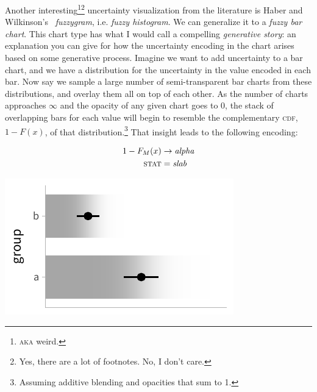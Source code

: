 \documentclass[journal]{vgtc}              %
\begin{document}
Another interesting\footnote{\textsc{aka} weird.}\footnote{Yes, there are a lot of footnotes. No, I don't care.} uncertainty visualization from the literature is Haber and Wilkinson's~\cite{haber1982perceptual} \textit{fuzzygram}, i.e. \textit{fuzzy histogram}. We can generalize it to a \textit{fuzzy bar chart}. This chart type has what I would call a compelling \textit{generative story}: an explanation you can give for how the uncertainty encoding in the chart arises based on some generative process. Imagine we want to add uncertainty to a bar chart, and we have a distribution for the uncertainty in the value encoded in each bar. Now say we sample a large number of semi-transparent bar charts from these distributions, and overlay them all on top of each other. As the number of charts approaches $\infty$ and the opacity of any given chart goes to 0, the stack of overlapping bars for each value will begin to resemble the complementary \textsc{cdf}, $1 - F(x)$, of that distribution.\footnote{Assuming additive blending and opacities that sum to 1.} That insight leads to the following encoding:

 \noindent
\begin{minipage}{.5\columnwidth}

\begin{align*}
1 - F_M(x) &\rightarrow \textit{alpha}\\
\textsc{stat} &= \mathit{slab}
\end{align*}
\end{minipage}%
  \begin{minipage}{.4\columnwidth}
    \centering
    \includegraphics[width=1.2\columnwidth]{figs/3-slab_fuzzygram.pdf}
  \end{minipage}
\hfill\break
\end{document}
